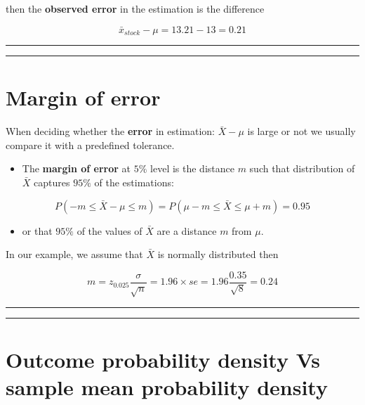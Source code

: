 \documentclass[
]{book}
\providecommand{\tightlist}{%
  \setlength{\itemsep}{0pt}\setlength{\parskip}{0pt}}
\begin{document}
then the \textbf{observed error} in the estimation is the difference

\[\bar{x}_{stock}-\mu=13.21-13=0.21\]

\begin{center}\rule{0.5\linewidth}{0.5pt}\end{center}

\begin{center}\rule{0.5\linewidth}{0.5pt}\end{center}

\hypertarget{margin-of-error-2}{%
\section{Margin of error}\label{margin-of-error-2}}

When deciding whether the \textbf{error} in estimation: \(\bar{X}-\mu\) is large or not we usually compare it with a predefined tolerance.

\begin{itemize}
\tightlist
\item
  The \textbf{margin of error} at \(5\%\) level is the distance \(m\) such that distribution of \(\bar{X}\) captures \(95\%\) of the estimations:
\end{itemize}

\[P(-m \leq \bar{X}-\mu \leq m)=P(\mu-m \leq \bar{X} \leq\mu + m)=0.95\]

\begin{itemize}
\tightlist
\item
  or that \(95\%\) of the values of \(\bar{X}\) are a distance \(m\) from \(\mu\).
\end{itemize}

In our example, we assume that \(\bar{X}\) is normally distributed then

\[m=z_{0.025} \frac{\sigma}{\sqrt{n}}=1.96\times se=1.96\frac{0.35}{\sqrt{8}}=0.24\]

\begin{center}\rule{0.5\linewidth}{0.5pt}\end{center}

\begin{center}\rule{0.5\linewidth}{0.5pt}\end{center}

\hypertarget{outcome-probability-density-vs-sample-mean-probability-density}{%
\section{Outcome probability density Vs sample mean probability density}\label{outcome-probability-density-vs-sample-mean-probability-density}}
\end{document}
